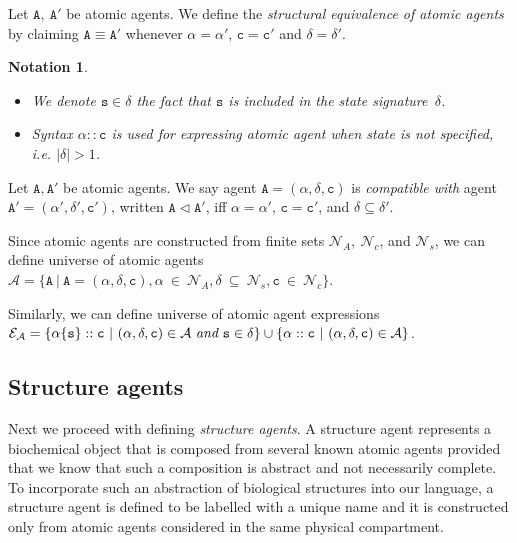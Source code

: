\documentclass{entcs}
\renewcommand{\~}[0]{\texttildelow}
\newtheorem{notation}[thm]{Notation}
\begin{document}
\begin{definition}
Let $\mathtt{A},~\mathtt{A}'$ be atomic agents. We define the \emph{structural equivalence of atomic agents} by claiming $\mathtt{A}\equiv\mathtt{A}'$ whenever $\mathtt{\alpha} = \mathtt{\alpha}'$, $\mathtt{c} = \mathtt{c}'$ and $\delta = \delta'$.
\end{definition}

\begin{notation}
{~}
\begin{itemize}
\item We denote $\mathtt{s}\in\delta$ the fact that $\mathtt{s}$ is included in the state signature~$\delta$.
\item Syntax $\alpha::\mathtt{c}$ is used for expressing atomic agent when state is not specified, i.e. $|\delta| > 1$.
\end{itemize}
\end{notation}

\begin{defn}
Let $\mathtt{A},\mathtt{A}'$ be atomic agents. We say agent $\mathtt{A}=(\alpha, \delta, \mathtt{c})$ is \emph{compatible with} agent $\mathtt{A}'=(\alpha', \delta', \mathtt{c}')$, written $\mathtt{A} \lhd \mathtt{A}'$, iff $\alpha = \alpha'$, $\mathtt{c} = \mathtt{c}'$, and $\delta \subseteq \delta'$. 
\end{defn}

\begin{theorem}
Since atomic agents are constructed from finite sets $\mathcal{N}_{A},~\mathcal{N}_{c}$, and $\mathcal{N}_{s}$, we can define universe of atomic agents $\mathcal{A} = \{ \mathtt{A}~|~\mathtt{A} = (\alpha, \delta, \mathtt{c}), \alpha~\in~\mathcal{N}_{A}, \delta~\subseteq~\mathcal{N}_{s},  \mathtt{c}~\in~\mathcal{N}_{c} \}$. 

\noindent Similarly, we can define universe of atomic agent expressions\\ $\mathcal{E}_\mathcal{A} = \{ \alpha\{\mathtt{s}\}::\mathtt{c} ~|~ (\alpha, \delta, \mathtt{c}) \in \mathcal{A}~\emph{and}~ \mathtt{s} \in \delta \} \cup \{ \alpha::\mathtt{c} ~|~ (\alpha, \delta, \mathtt{c}) \in \mathcal{A}\}$.
\end{theorem}

\subsection{Structure agents}

Next we proceed with defining \emph{structure agents}. A structure agent represents a biochemical object that is composed from several known atomic agents provided that we know that such a composition is abstract and not necessarily complete. To incorporate such an abstraction of biological structures into our language, a structure agent is defined to be labelled with a unique name and it is constructed only from atomic agents considered in the same physical compartment. 
\end{document}

